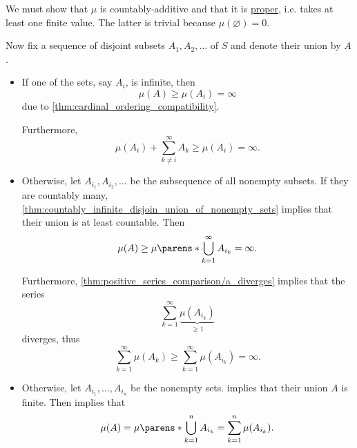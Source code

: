 \begin{defproof}
  We must show that \( \mu \) is countably-additive and that it is \hyperref[def:effective_domain]{proper}, i.e. takes at least one finite value. The latter is trivial because \( \mu(\varnothing) = 0 \).

  Now fix a sequence of disjoint subsets \( A_1, A_2, \ldots \) of \( S \) and denote their union by \( A \).

  \begin{itemize}
    \item If one of the sets, say \( A_i \), is infinite, then
    \begin{equation*}
      \mu(A) \geq \mu(A_i) = \infty
    \end{equation*}
    due to \cref{thm:cardinal_ordering_compatibility}.

    Furthermore,
    \begin{equation*}
      \mu(A_i) + \sum_{k \neq i}^\infty A_k \geq \mu(A_i) = \infty.
    \end{equation*}

    \item Otherwise, let \( A_{i_1}, A_{i_2}, \ldots \) be the subsequence of all nonempty subsets. If they are countably many, \cref{thm:countably_infinite_disjoin_union_of_nonempty_sets} implies that their union is at least countable. Then
    \begin{equation*}
      \mu(A) \geq \mu\parens*{ \bigcup_{k=1}^\infty A_{i_k} } = \infty.
    \end{equation*}

    Furthermore, \cref{thm:positive_series_comparison/a_diverges} implies that the series
    \begin{equation*}
      \sum_{k=1}^\infty \underbrace{\mu(A_{i_k})}_{\geq 1}
    \end{equation*}
    diverges, thus
    \begin{equation*}
      \sum_{k=1}^\infty \mu(A_k) \geq \sum_{k=1}^\infty \mu(A_{i_k}) = \infty.
    \end{equation*}

    \item Otherwise, let \( A_{i_1}, \ldots, A_{i_n} \) be the nonempty sets.  implies that their union \( A \) is finite. Then  implies that
    \begin{equation*}
      \mu(A) = \mu\parens*{ \bigcup_{k=1}^n A_{i_k} } = \sum_{k=1}^n \mu(A_{i_k}).
    \end{equation*}
  \end{itemize}
\end{defproof}
